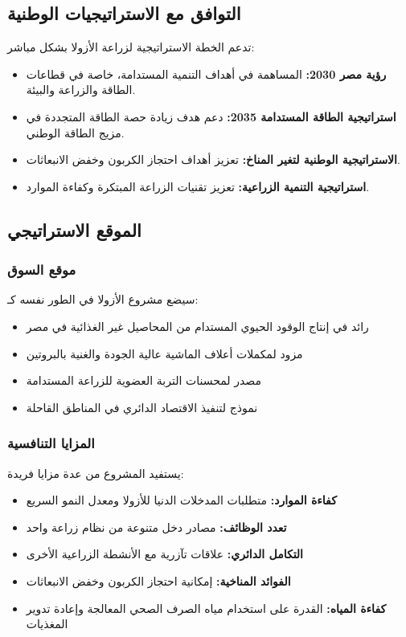\subsection{التوافق مع الاستراتيجيات الوطنية}

تدعم الخطة الاستراتيجية لزراعة الأزولا بشكل مباشر:

\begin{itemize}
    \item \textbf{رؤية مصر 2030:} المساهمة في أهداف التنمية المستدامة، خاصة في قطاعات الطاقة والزراعة والبيئة.
    
    \item \textbf{استراتيجية الطاقة المستدامة 2035:} دعم هدف زيادة حصة الطاقة المتجددة في مزيج الطاقة الوطني.
    
    \item \textbf{الاستراتيجية الوطنية لتغير المناخ:} تعزيز أهداف احتجاز الكربون وخفض الانبعاثات.
    
    \item \textbf{استراتيجية التنمية الزراعية:} تعزيز تقنيات الزراعة المبتكرة وكفاءة الموارد.
\end{itemize}

\subsection{الموقع الاستراتيجي}

\subsubsection{موقع السوق}
سيضع مشروع الأزولا في الطور نفسه كـ:

\begin{itemize}
    \item رائد في إنتاج الوقود الحيوي المستدام من المحاصيل غير الغذائية في مصر
    \item مزود لمكملات أعلاف الماشية عالية الجودة والغنية بالبروتين
    \item مصدر لمحسنات التربة العضوية للزراعة المستدامة
    \item نموذج لتنفيذ الاقتصاد الدائري في المناطق القاحلة
\end{itemize}

\subsubsection{المزايا التنافسية}
يستفيد المشروع من عدة مزايا فريدة:

\begin{itemize}
    \item \textbf{كفاءة الموارد:} متطلبات المدخلات الدنيا للأزولا ومعدل النمو السريع
    \item \textbf{تعدد الوظائف:} مصادر دخل متنوعة من نظام زراعة واحد
    \item \textbf{التكامل الدائري:} علاقات تآزرية مع الأنشطة الزراعية الأخرى
    \item \textbf{الفوائد المناخية:} إمكانية احتجاز الكربون وخفض الانبعاثات
    \item \textbf{كفاءة المياه:} القدرة على استخدام مياه الصرف الصحي المعالجة وإعادة تدوير المغذيات
\end{itemize}

